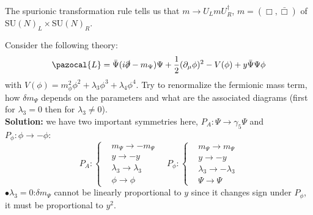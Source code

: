\documentclass[../main.tex]{subfiles}
\begin{document}
The spurionic transformation rule tells us that $m\to U_LmU^\dagger_R$, $m=(\Box,\bar{\Box})$ of SU$(N)_L\times$SU$(N)_R$.
\begin{exercise}
Consider the following theory:
\[
\pazocal{L}=\bar{\Psi}(i\slashed{\partial}-m_\Psi)\Psi+\frac{1}{2}(\partial_\mu\phi)^2-V(\phi)+y\bar{\Psi}\Psi\phi
\]
with $V(\phi)=m_\phi^2\phi^2+\lambda_3\phi^3+\lambda_4\phi^4$. Try to renormalize the fermionic mass term, how $\delta m_\Psi$ depends on the parameters and what are the associated diagrams (first for $\lambda_3=0$ then for $\lambda_3\neq0$).\\
\textbf{Solution:} we have two important symmetries here, $P_A:\Psi\to\gamma_5\Psi$ and $P_\phi: \phi\to-\phi:$
\[
P_A:
\left\{
\begin{aligned}
&m_\Psi\to-m_\Psi\\
&y\to-y\\
&\lambda_3\to\lambda_3\\
&\phi\to\phi
\end{aligned}
\right.
\quad 
P_\phi:
\left\{
\begin{aligned}
&m_\Psi\to m_\Psi\\
&y\to-y\\
&\lambda_3\to-\lambda_3\\
&\Psi\to\Psi
\end{aligned}
\right.
\]
$\bullet\lambda_3=0$:\;$\delta m_\Psi$ cannot be linearly proportional to $y$ since it changes sign under $P_\phi$, it must be proportional to $y^2$. 
\end{exercise}
\end{document}
